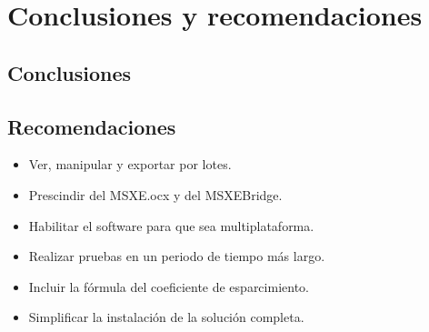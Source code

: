 \chapter{Conclusiones y recomendaciones}

\capV

\section{Conclusiones}

\section{Recomendaciones}

\begin{itemize}

	\item Ver, manipular y exportar por lotes.
	
	\item Prescindir del MSXE.ocx y del MSXEBridge.
	
	\item Habilitar el software para que sea multiplataforma.
	
	\item Realizar pruebas en un periodo de tiempo m\'{a}s largo.
	
	\item Incluir la f\'{o}rmula del coeficiente de esparcimiento.
	
	\item Simplificar la instalaci\'{o}n de la soluci\'{o}n completa.
\end{itemize}